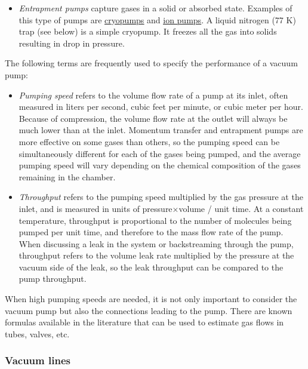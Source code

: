 \documentclass[byrevtex,amssymb,aps,pra,floatfix,letterpaper]{revtex4}
\begin{document}
\begin{itemize}
\item \textit{Entrapment pumps} capture gases in a solid or absorbed state. Examples of this type of pumps are \href{http://en.wikipedia.org/wiki/Cryopump}{\underline{cryopumps}} and \href{http://en.wikipedia.org/wiki/Ion_pump_\%28physics\%29}{\underline{ion pumps}}. A liquid nitrogen (77 K) trap (see below) is a simple cryopump. It freezes all the gas into solids resulting in drop in pressure.
\end{itemize}

The following terms are frequently used to specify the performance of a vacuum pump:

\begin{itemize}
\item \textit{Pumping speed} refers to the volume flow rate of a pump at its inlet, often measured in liters per second, cubic feet per minute, or cubic meter per hour. Because of compression, the volume flow rate at the outlet will always be much lower than at the inlet. Momentum transfer and entrapment pumps are more effective on some gases than others, so the pumping speed can be simultaneously different for each of the gases being pumped, and the average pumping speed will vary depending on the chemical composition of the gases remaining in the chamber.
\item \textit{Throughput} refers to the pumping speed multiplied by the gas pressure at the inlet, and is measured in units of pressure$\times$volume / unit time. At a constant temperature, throughput is proportional to the number of molecules being pumped per unit time, and therefore to the mass flow rate of the pump. When discussing a leak in the system or backstreaming through the pump, throughput refers to the volume leak rate multiplied by the pressure at the vacuum side of the leak, so the leak throughput can be compared to the pump throughput.
\end{itemize}

When high pumping speeds are needed, it is not only important to consider the vacuum pump but also the connections leading to the pump. There are known formulas available in the literature that can be used to estimate gas flows in tubes, valves, etc.

\subsubsection{Vacuum lines}
\end{document}
